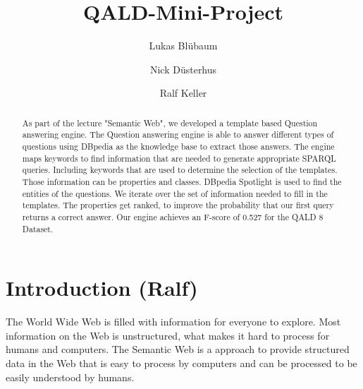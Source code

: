 \documentclass[runningheads]{llncs}
\begin{document}
%
\title{QALD-Mini-Project}
%
\newcommand\tab[1][1cm]{\hspace*{#1}}
\author{Lukas Bl{\"u}baum \and
Nick D{\"u}sterhus \and
Ralf Keller}
%
%



%
\maketitle              %
%
\begin{abstract}
As part of the lecture "Semantic Web", we developed a template based Question answering engine. The Question answering engine is able to answer different types of questions using DBpedia as the knowledge base to extract those answers.
The engine maps keywords to find information that are needed to generate appropriate SPARQL queries. Including keywords that are used to determine the selection of the templates.
Those information can be properties and classes. DBpedia Spotlight is used to find the entities of the questions.
We iterate over the set of information needed to fill in the templates.
The properties get ranked, to improve the probability that our first query returns a correct answer.
Our engine achieves an F-score of 0.527 for the QALD 8 Dataset.

\end{abstract}
%
%
%
\section{Introduction (Ralf)}  

The World Wide Web is filled with information for everyone to explore. Most information on the Web is unstructured, what makes it hard to process for humans and computers. The Semantic Web is a approach to provide structured data in the Web that is easy to process by computers and can be processed to be easily understood by humans. \\
\end{document}
